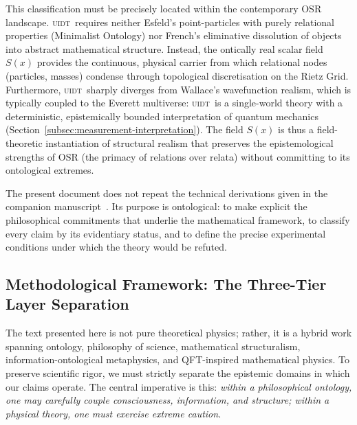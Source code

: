 \documentclass[12pt,a4paper,twoside]{article}
\theoremstyle{plain}
\theoremstyle{definition}
\theoremstyle{remark}
\newcommand{\UIDT}{\textsc{uidt}}
\begin{document}
This classification must be precisely located within the contemporary
OSR landscape. \UIDT\ requires neither Esfeld's point-particles with
purely relational properties (Minimalist Ontology) nor French's eliminative
dissolution of objects into abstract mathematical structure. Instead, the
ontically real scalar field $S(x)$ provides the continuous, physical carrier
from which relational nodes (particles, masses) condense through topological
discretisation on the Rietz Grid. Furthermore, \UIDT\ sharply diverges from
Wallace's wavefunction realism, which is typically coupled to the Everett
multiverse: \UIDT\ is a single-world theory with a deterministic,
epistemically bounded interpretation of quantum mechanics
(Section~\ref{subsec:measurement-interpretation}). The field $S(x)$ is thus a
field-theoretic instantiation of structural realism that preserves the
epistemological strengths of OSR (the primacy of relations over
relata) without committing to its ontological extremes.

The present document does not repeat the technical derivations given in the
companion manuscript~\cite{Rietz2026_Framework}. Its purpose is ontological: to
make explicit the philosophical commitments that underlie the mathematical
framework, to classify every claim by its evidentiary status, and to define the
precise experimental conditions under which the theory would be refuted.
\newpage
\subsection{Methodological Framework: The Three-Tier Layer Separation}
\label{subsec:layer-separation}

The text presented here is not pure theoretical physics; rather, it is a hybrid work spanning ontology, philosophy of science, mathematical structuralism, information-ontological metaphysics, and QFT-inspired mathematical physics. To preserve scientific rigor, we must strictly separate the epistemic domains in which our claims operate. The central imperative is this: \emph{within a philosophical ontology, one may carefully couple consciousness, information, and structure; within a physical theory, one must exercise extreme caution.}
\end{document}
